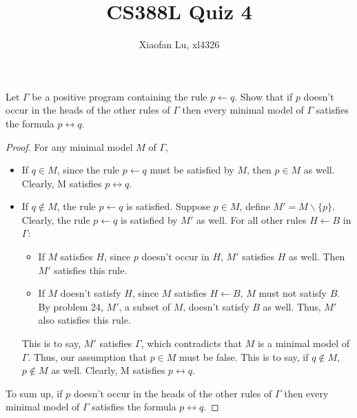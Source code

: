 \documentclass[12pt]{article}
\begin{document}
\title{CS388L Quiz 4}
\author{Xiaofan Lu, xl4326}
\date{\vspace{-3ex}}
\maketitle

\noindent
Let $\Gamma$ be a positive program containing the rule $p \leftarrow q$. Show that if $p$ doesn't occur in the heads of the other rules of $\Gamma$ then every minimal model of $\Gamma$ satisfies the formula $p \leftrightarrow q$. 

\begin{proof}
For any minimal model $M$ of $\Gamma$, 
\begin{itemize}
   \item If $q \in M$, since the rule $p \leftarrow q$ must be satisfied by $M$, then $p \in M$ as well. Clearly, M satisfies $p \leftrightarrow q$.  
   \item If $q \not \in M$, the rule $p \leftarrow q$ is satisfied. Suppose $p \in M$, define $M' = M \backslash \{p\}$. Clearly, the rule $p \leftarrow q$ is satisfied by $M'$ as well. For all other rules $H \leftarrow B$ in $\Gamma$:
   \begin{itemize}
       \item If $M$ satisfies $H$, since $p$ doesn't occur in $H$, $M'$ satisfies $H$ as well. Then $M'$ satisfies this rule. 
       \item If $M$ doesn't satisfy $H$, since $M$ satisfies $H \leftarrow B$, $M$ must not satisfy $B$. By problem 24, $M'$, a subset of $M$, doesn't satisfy $B$ as well. Thus, $M'$ also satisfies this rule. 
   \end{itemize}
   This is to say, $M'$ satisfies $\Gamma$, which contradicts that $M$ is a minimal model of $\Gamma$. Thus, our assumption that $p \in M$ must be false. This is to say, if $q \not \in M$, $p \not \in M$ as well. Clearly, M satisfies $p \leftrightarrow q$. 
\end{itemize}
To sum up, if $p$ doesn't occur in the heads of the other rules of $\Gamma$ then every minimal model of $\Gamma$ satisfies the formula $p \leftrightarrow q$. 

\end{proof}
\end{document}
